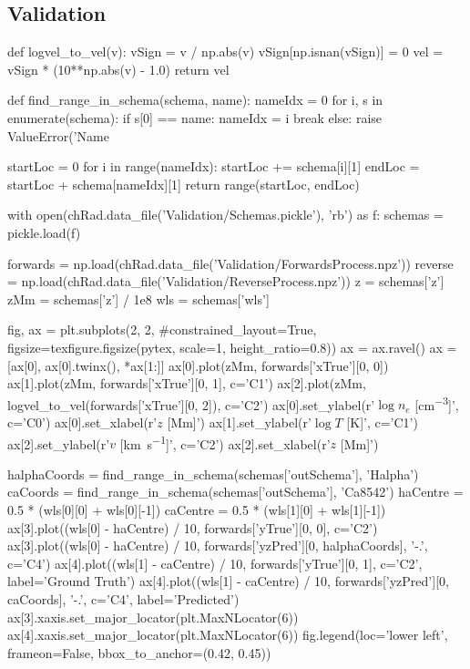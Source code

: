 \subsection{Validation}

\begin{pycode}[Radynversion]
def logvel_to_vel(v):
    vSign = v / np.abs(v)
    vSign[np.isnan(vSign)] = 0
    vel = vSign * (10**np.abs(v) - 1.0)
    return vel

def find_range_in_schema(schema, name):
    nameIdx = 0
    for i, s in enumerate(schema):
        if s[0] == name:
            nameIdx = i
            break
    else:
        raise ValueError('Name %

    startLoc = 0
    for i in range(nameIdx):
        startLoc += schema[i][1]
    endLoc = startLoc + schema[nameIdx][1]
    return range(startLoc, endLoc)

with open(chRad.data_file('Validation/Schemas.pickle'), 'rb') as f:
    schemas = pickle.load(f)

forwards = np.load(chRad.data_file('Validation/ForwardsProcess.npz'))
reverse = np.load(chRad.data_file('Validation/ReverseProcess.npz'))
z = schemas['z']
zMm = schemas['z'] / 1e8
wls = schemas['wls']

fig, ax = plt.subplots(2, 2, #constrained_layout=True,
                       figsize=texfigure.figsize(pytex, scale=1, height_ratio=0.8))
ax = ax.ravel()
ax = [ax[0], ax[0].twinx(), *ax[1:]]
ax[0].plot(zMm, forwards['xTrue'][0, 0])
ax[1].plot(zMm, forwards['xTrue'][0, 1], c='C1')
ax[2].plot(zMm, logvel_to_vel(forwards['xTrue'][0, 2]), c='C2')
ax[0].set_ylabel(r'$\log{n_e}$ [\si{\cm\tothe{-3}}]', c='C0')
ax[0].set_xlabel(r'$z$ [\si{\mega\metre}]')
ax[1].set_ylabel(r'$\log{T}$ [\si{\K}]', c='C1')
ax[2].set_ylabel(r'$v$ [\si{\kilo\metre\per\second}]', c='C2')
ax[2].set_xlabel(r'$z$ [\si{\mega\metre}]')


halphaCoords = find_range_in_schema(schemas['outSchema'], 'Halpha')
caCoords = find_range_in_schema(schemas['outSchema'], 'Ca8542')
haCentre = 0.5 * (wls[0][0] + wls[0][-1])
caCentre = 0.5 * (wls[1][0] + wls[1][-1])
ax[3].plot((wls[0] - haCentre) / 10, forwards['yTrue'][0, 0], c='C2')
ax[3].plot((wls[0] - haCentre) / 10, forwards['yzPred'][0, halphaCoords], '-.', c='C4')
ax[4].plot((wls[1] - caCentre) / 10, forwards['yTrue'][0, 1], c='C2', label='Ground Truth')
ax[4].plot((wls[1] - caCentre) / 10, forwards['yzPred'][0, caCoords], '-.', c='C4', label='Predicted')
ax[3].xaxis.set_major_locator(plt.MaxNLocator(6))
ax[4].xaxis.set_major_locator(plt.MaxNLocator(6))
fig.legend(loc='lower left', frameon=False, bbox_to_anchor=(0.42, 0.45))


\end{pycode}
